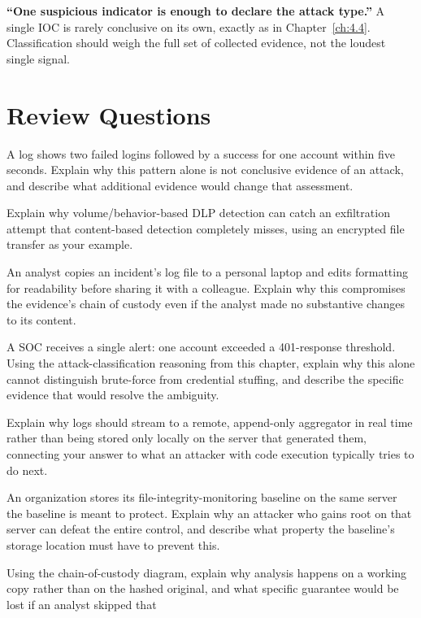 \begin{misconception}
\textbf{``One suspicious indicator is enough to declare the attack type.''} A single IOC is rarely
conclusive on its own, exactly as in Chapter~\ref{ch:4.4}. Classification should weigh the full set
of collected evidence, not the loudest single signal.
\end{misconception}

\section*{Review Questions}
\begin{reviewquestions}
\item A log shows two failed logins followed by a success for one account within five seconds.
Explain why this pattern alone is not conclusive evidence of an attack, and describe what
additional evidence would change that assessment.
\item Explain why volume/behavior-based DLP detection can catch an exfiltration attempt that
content-based detection completely misses, using an encrypted file transfer as your example.
\item An analyst copies an incident's log file to a personal laptop and edits formatting for
readability before sharing it with a colleague. Explain why this compromises the evidence's chain
of custody even if the analyst made no substantive changes to its content.
\item A SOC receives a single alert: one account exceeded a 401-response threshold. Using the
attack-classification reasoning from this chapter, explain why this alone cannot distinguish
brute-force from credential stuffing, and describe the specific evidence that would resolve the
ambiguity.
\item Explain why logs should stream to a remote, append-only aggregator in real time rather than
being stored only locally on the server that generated them, connecting your answer to what an
attacker with code execution typically tries to do next.
\item An organization stores its file-integrity-monitoring baseline on the same server the baseline
is meant to protect. Explain why an attacker who gains root on that server can defeat the entire
control, and describe what property the baseline's storage location must have to prevent this.
\item Using the chain-of-custody diagram, explain why analysis happens on a working copy rather
than on the hashed original, and what specific guarantee would be lost if an analyst skipped that

\end{reviewquestions}
